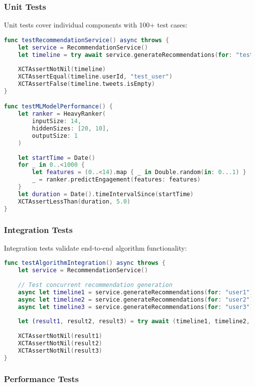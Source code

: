 \documentclass[11pt,a4paper]{article}
\begin{document}
\subsubsection{Unit Tests}

Unit tests cover individual components with 100+ test cases:

\begin{lstlisting}[language=Swift, caption=Unit Test Example]
func testRecommendationService() async throws {
    let service = RecommendationService()
    let timeline = try await service.generateRecommendations(for: "test_user")
    
    XCTAssertNotNil(timeline)
    XCTAssertEqual(timeline.userId, "test_user")
    XCTAssertFalse(timeline.tweets.isEmpty)
}

func testMLModelPerformance() {
    let ranker = HeavyRanker(
        inputSize: 14,
        hiddenSizes: [20, 10],
        outputSize: 1
    )
    
    let startTime = Date()
    for _ in 0..<1000 {
        let features = (0..<14).map { _ in Double.random(in: 0...1) }
        _ = ranker.predictEngagement(features: features)
    }
    let duration = Date().timeIntervalSince(startTime)
    XCTAssertLessThan(duration, 5.0)
}
\end{lstlisting}

\subsubsection{Integration Tests}

Integration tests validate end-to-end algorithm functionality:

\begin{lstlisting}[language=Swift, caption=Integration Test Example]
func testAlgorithmIntegration() async throws {
    let service = RecommendationService()
    
    // Test concurrent recommendation generation
    async let timeline1 = service.generateRecommendations(for: "user1")
    async let timeline2 = service.generateRecommendations(for: "user2")
    async let timeline3 = service.generateRecommendations(for: "user3")
    
    let (result1, result2, result3) = try await (timeline1, timeline2, timeline3)
    
    XCTAssertNotNil(result1)
    XCTAssertNotNil(result2)
    XCTAssertNotNil(result3)
}
\end{lstlisting}

\subsubsection{Performance Tests}
\end{document}
